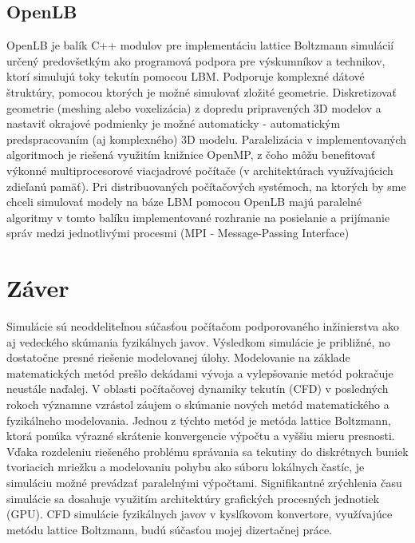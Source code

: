 \documentclass[]{tukediphc}
\begin{document}
\subsection{OpenLB}

OpenLB je balík C++ modulov pre implementáciu lattice Boltzmann simulácií určený predovšetkým ako programová podpora pre výskumníkov a technikov, ktorí simulujú toky tekutín pomocou LBM. Podporuje komplexné dátové štruktúry, pomocou ktorých je možné simulovať zložité geometrie. Diskretizovať geometrie (meshing alebo voxelizácia) z dopredu pripravených 3D modelov a nastaviť okrajové podmienky je možné automaticky - automatickým predspracovaním (aj komplexného) 3D modelu. Paralelizácia v implementovaných algoritmoch je riešená využitím knižnice OpenMP, z čoho môžu benefitovať výkonné multiprocesorové viacjadrové počítače (v architektúrach využívajúcich zdieľanú pamäť). Pri distribuovaných počítačových systémoch, na ktorých by sme chceli simulovať modely na báze LBM pomocou OpenLB majú paralelné algoritmy v tomto balíku implementované rozhranie na posielanie a prijímanie správ medzi jednotlivými procesmi (MPI - Message-Passing Interface)

\section{Záver}

Simulácie sú neoddeliteľnou súčasťou počítačom podporovaného inžinierstva ako aj vedeckého skúmania fyzikálnych javov. Výsledkom simulácie je približné, no dostatočne presné riešenie modelovanej úlohy. Modelovanie na základe matematických metód prešlo dekádami vývoja a vylepšovanie metód pokračuje neustále naďalej. V oblasti počítačovej dynamiky tekutín (CFD) v posledných rokoch významne vzrástol záujem o skúmanie nových metód matematického a fyzikálneho modelovania. Jednou z týchto metód je metóda lattice Boltzmann, ktorá ponúka výrazné skrátenie konvergencie výpočtu a vyššiu mieru presnosti. Vďaka rozdeleniu riešeného problému správania sa tekutiny do diskrétnych buniek tvoriacich mriežku a modelovaniu pohybu ako súboru lokálnych častíc, je simuláciu možné prevádzať paralelnými výpočtami. Signifikantné zrýchlenia času simulácie sa dosahuje využitím architektúry grafických procesných jednotiek (GPU). CFD simulácie fyzikálnych javov v kyslíkovom konvertore, využívajúce metódu lattice Boltzmann, budú súčasťou mojej dizertačnej práce.

%

%
\end{document}
